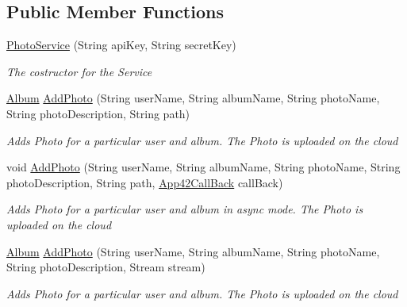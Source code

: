 \subsection*{Public Member Functions}
\begin{DoxyCompactItemize}
\item 
\hyperlink{classcom_1_1shephertz_1_1app42_1_1paas_1_1sdk_1_1csharp_1_1gallery_1_1_photo_service_a6b4b5981802d8483836b4417e7da0cf9}{Photo\+Service} (String api\+Key, String secret\+Key)
\begin{DoxyCompactList}\small\item\em The costructor for the Service \end{DoxyCompactList}\item 
\hyperlink{classcom_1_1shephertz_1_1app42_1_1paas_1_1sdk_1_1csharp_1_1gallery_1_1_album}{Album} \hyperlink{classcom_1_1shephertz_1_1app42_1_1paas_1_1sdk_1_1csharp_1_1gallery_1_1_photo_service_a562d6a54226166722ccd6c15c1cde9ed}{Add\+Photo} (String user\+Name, String album\+Name, String photo\+Name, String photo\+Description, String path)
\begin{DoxyCompactList}\small\item\em Adds Photo for a particular user and album. The Photo is uploaded on the cloud \end{DoxyCompactList}\item 
void \hyperlink{classcom_1_1shephertz_1_1app42_1_1paas_1_1sdk_1_1csharp_1_1gallery_1_1_photo_service_a54d2edab97e535409e8d06b2090689bc}{Add\+Photo} (String user\+Name, String album\+Name, String photo\+Name, String photo\+Description, String path, \hyperlink{interfacecom_1_1shephertz_1_1app42_1_1paas_1_1sdk_1_1csharp_1_1_app42_call_back}{App42\+Call\+Back} call\+Back)
\begin{DoxyCompactList}\small\item\em Adds Photo for a particular user and album in async mode. The Photo is uploaded on the cloud \end{DoxyCompactList}\item 
\hyperlink{classcom_1_1shephertz_1_1app42_1_1paas_1_1sdk_1_1csharp_1_1gallery_1_1_album}{Album} \hyperlink{classcom_1_1shephertz_1_1app42_1_1paas_1_1sdk_1_1csharp_1_1gallery_1_1_photo_service_afbcdfc2433c59bac1cfe19ad0a20587c}{Add\+Photo} (String user\+Name, String album\+Name, String photo\+Name, String photo\+Description, Stream stream)
\begin{DoxyCompactList}\small\item\em Adds Photo for a particular user and album. The Photo is uploaded on the cloud \end{DoxyCompactList}\item 

\end{DoxyCompactItemize}
